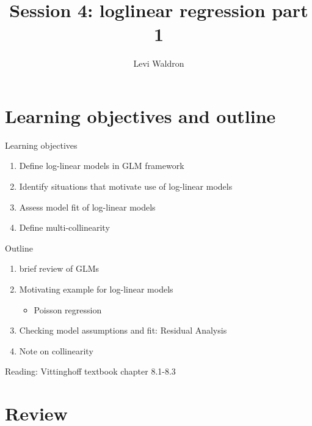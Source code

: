 \documentclass[ignorenonframetext,]{beamer}
\title{Session 4: loglinear regression part 1}
\author{Levi Waldron}
\institute{CUNY SPH Biostatistics 2}
\date{}
\providecommand{\tightlist}{%
  \setlength{\itemsep}{0pt}\setlength{\parskip}{0pt}}
\begin{document}
\frame{\titlepage}

\hypertarget{learning-objectives-and-outline}{%
\section{Learning objectives and
outline}\label{learning-objectives-and-outline}}

\begin{frame}{Learning objectives}
\protect\hypertarget{learning-objectives}{}

\begin{enumerate}
\tightlist
\item
  Define log-linear models in GLM framework
\item
  Identify situations that motivate use of log-linear models
\item
  Assess model fit of log-linear models
\item
  Define multi-collinearity
\end{enumerate}

\end{frame}

\begin{frame}{Outline}
\protect\hypertarget{outline}{}

\begin{enumerate}
\tightlist
\item
  brief review of GLMs
\item
  Motivating example for log-linear models

  \begin{itemize}
  \tightlist
  \item
    Poisson regression
  \end{itemize}
\item
  Checking model assumptions and fit: Residual Analysis
\item
  Note on collinearity
\end{enumerate}

Reading: Vittinghoff textbook chapter 8.1-8.3

\end{frame}

\hypertarget{review}{%
\section{Review}\label{review}}
\end{document}
